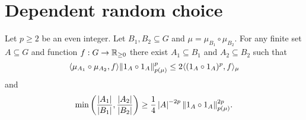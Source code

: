 \chapter{Dependent random choice}


\begin{lemma}
\label{lem-drc}
\leanok
Let $p\geq 2$ be an even integer. Let $B_1,B_2\subseteq G$ and $\mu=\mu_{B_1}\circ\mu_{B_2}$. For any finite set $A\subseteq G$ and function $f:G\to\mathbb{R}_{\geq 0}$ there exist $A_1\subseteq B_1$ and $A_2\subseteq B_2$ such that
\[\langle \mu_{A_1}\circ \mu_{A_2}, f\rangle \lVert 1_{A}\circ 1_{A}\rVert_{p(\mu)}^p\leq 2\langle (1_{A}\circ 1_{A})^p,f\rangle_\mu\]
and
\[\min\left( \frac{\left\lvert A_1\right\rvert}{\left\lvert B_1\right\rvert},\frac{\left\lvert A_2\right\rvert}{\left\lvert B_2\right\rvert}\right)\geq \frac{1}{4}\left\lvert A\right\rvert^{-2p}\lVert 1_{A}\circ 1_{A}\rVert_{p(\mu)}^{2p}.\]
\end{lemma}

